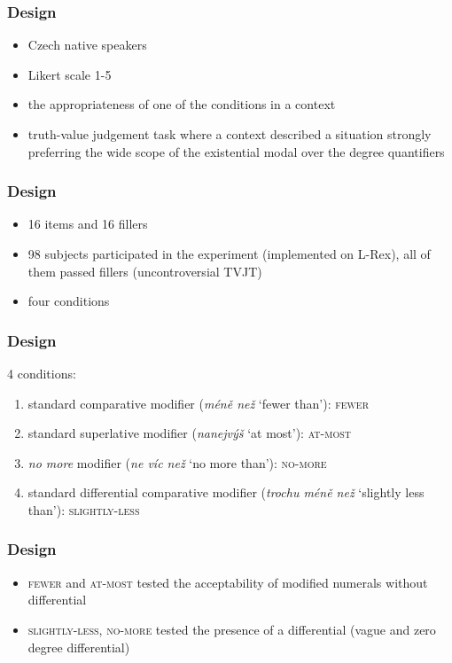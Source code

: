\documentclass[10pt
]{beamer}
\newcommand{\cond}[1]{\textsc{#1}}
\begin{document}
\begin{frame}
  \frametitle{Design}

  \begin{itemize}
    \item Czech native speakers 
    \item Likert scale 1-5
    \item  the appropriateness of one of the conditions in a context
    \item truth-value judgement task where a context described a situation strongly preferring the wide scope of the existential modal over the degree quantifiers
  \end{itemize}
\end{frame}

\begin{frame}
  \frametitle{Design}

\begin{itemize}
    \item 16 items and 16 fillers
    \item 98 subjects participated in the experiment (implemented on L-Rex), all of them passed fillers (uncontroversial TVJT)
    \item four conditions
  \end{itemize}
  

\end{frame}

\begin{frame}
  \frametitle{Design}

4 conditions:

\begin{enumerate}
  \item standard comparative modifier (\textit{méně než} `fewer than'): \cond{fewer}
  \item standard superlative modifier (\textit{nanejvýš} `at most'):  \cond{at-most}
  \item \textit{no more} modifier (\textit{ne víc než} `no more than'): \cond{no-more}
  \item standard differential comparative modifier (\textit{trochu méně než} `slightly less than'): \cond{slightly-less}
\end{enumerate}

\end{frame}

\begin{frame}
  \frametitle{Design}

  \begin{itemize}
    \item \cond{fewer} and \cond{at-most} tested the acceptability of modified numerals without differential
    \item \cond{slightly-less}, \cond{no-more} tested the presence of a differential (vague and zero degree differential)
  \end{itemize}
  
\end{frame}
\end{document}
